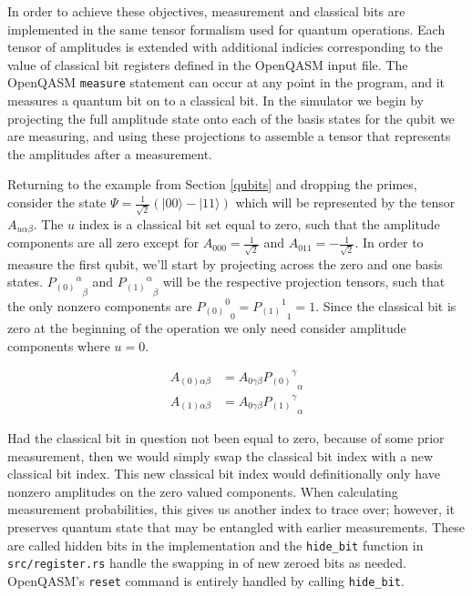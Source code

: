 \documentclass[%
 reprint,
 amsmath,amssymb,
 aps,
]{revtex4-2}
\begin{document}
In order to achieve these objectives, measurement and classical bits are implemented in the same tensor formalism used for quantum operations. Each tensor of amplitudes is extended with additional indicies corresponding to the value of classical bit registers defined in the OpenQASM input file. The OpenQASM \texttt{measure} statement can occur at any point in the program, and it measures a quantum bit on to a classical bit. In the simulator we begin by projecting the full amplitude state onto each of the basis states for the qubit we are measuring, and using these projections to assemble a tensor that represents the amplitudes after a measurement.

Returning to the example from Section \ref{qubits} and dropping the primes, consider the state $\Psi = \frac{1}{\sqrt{2}} (|00\rangle - |11\rangle)$ which will be represented by the tensor $A_{u \alpha\beta }$. The $u$ index is a classical bit set equal to zero, such that the amplitude components are all zero except for $A_{000} = \frac{1}{\sqrt{2}}$ and $A_{011} = -\frac{1}{\sqrt{2}}$. In order to measure the first qubit, we'll start by projecting across the zero and one basis states. ${{P_{(0)}}^{\alpha}}_{\beta}$ and ${{P_{(1)}}^{\alpha}}_{\beta}$ will be the respective projection tensors, such that the only nonzero components are ${{P_{(0)}}^{0}}_0 = {{P_{(1)}}^{1}}_1 = 1$. Since the classical bit is zero at the beginning of the operation we only need consider amplitude components where $u=0$.

\begin{align*} 
A_{(0)\alpha\beta}  &= A_{0 \gamma\beta}  {{P_{(0)}}^{\gamma}}_{\alpha} \\
A_{(1)\alpha\beta}  &= A_{0 \gamma\beta}  {{P_{(1)}}^{\gamma}}_{\alpha}
\end{align*}

Had the classical bit in question not been equal to zero, because of some prior measurement, then we would simply swap the classical bit index with a new classical bit index. This new classical bit index would definitionally only have nonzero amplitudes on the zero valued components. When calculating measurement probabilities, this gives us another index to trace over; however, it preserves quantum state that may be entangled with earlier measurements. These are called hidden bits in the implementation and the \texttt{hide\_bit} function in \texttt{src/register.rs} handle the swapping in of new zeroed bits as needed. OpenQASM's \texttt{reset} command is entirely handled by calling \texttt{hide\_bit}.
\end{document}

